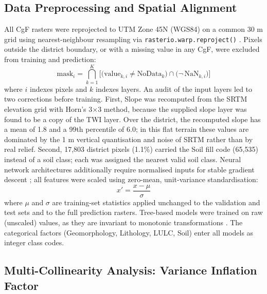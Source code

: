\documentclass[12pt, a4paper]{article}
\begin{document}
\subsection{Data Preprocessing and Spatial Alignment}

All CgF rasters were reprojected to UTM Zone 45N (WGS84) on a common 30 m grid using nearest-neighbour resampling via \texttt{rasterio.warp.reproject()} \citep{gillies2019}. Pixels outside the district boundary, or with a missing value in any CgF, were excluded from training and prediction:
\begin{equation}
    \text{mask}_{i} = \bigcap_{k=1}^{K}\Big[\big(\text{value}_{k,i} \neq \text{NoData}_k\big) \cap \big(\neg\,\text{NaN}_{k,i}\big)\Big]
\end{equation}
where $i$ indexes pixels and $k$ indexes layers. An audit of the input layers led to two corrections before training. First, Slope was recomputed from the SRTM elevation grid with Horn's 3$\times$3 method, because the supplied slope layer was found to be a copy of the TWI layer. Over the district, the recomputed slope has a mean of 1.8\textdegree{} and a 99th percentile of 6.0\textdegree; in this flat terrain these values are dominated by the 1 m vertical quantisation and noise of SRTM rather than by real relief. Second, 17,803 district pixels (1.1\%) carried the Soil fill code (65,535) instead of a soil class; each was assigned the nearest valid soil class. Neural network architectures additionally require normalised inputs for stable gradient descent \citep{lecun2012, Goodfellow2016}; all features were scaled using zero-mean, unit-variance standardisation:
\begin{equation}
    x' = \frac{x - \mu}{\sigma}
\end{equation}
where $\mu$ and $\sigma$ are training-set statistics applied unchanged to the validation and test sets and to the full prediction rasters. Tree-based models were trained on raw (unscaled) values, as they are invariant to monotonic transformations \citep{breiman2001}. The categorical factors (Geomorphology, Lithology, LULC, Soil) enter all models as integer class codes.

\subsection{Multi-Collinearity Analysis: Variance Inflation Factor}
\end{document}
